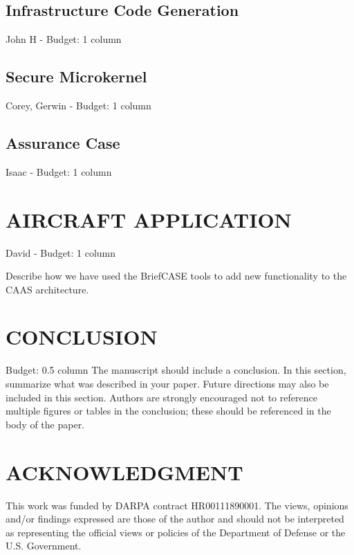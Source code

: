 \documentclass{IEEEcsmag}
\begin{document}
\subsection{Infrastructure Code Generation}
John H -  Budget: 1 column



\subsection{Secure Microkernel}
Corey, Gerwin -  Budget: 1 column
\cite{sel4-formal}

\subsection{Assurance Case}
Isaac -  Budget: 1 column
\cite{resolute-destion}



\section{AIRCRAFT APPLICATION}
David -  Budget: 1 column

Describe how we have used the BriefCASE tools to add new functionality to the CAAS architecture.  

\section{CONCLUSION}
 Budget: 0.5 column
The manuscript should include a conclusion. In this section, summarize what was described in your paper. Future directions may also be included in this section. Authors are strongly encouraged not to reference multiple figures or tables in the conclusion; these should be referenced in the body of the paper.

\section{ACKNOWLEDGMENT}

This work was funded by DARPA contract HR00111890001. The
views, opinions and/or findings expressed are those of the author
and should not be interpreted as representing the official views or
policies of the Department of Defense or the U.S. Government.





\end{document}
